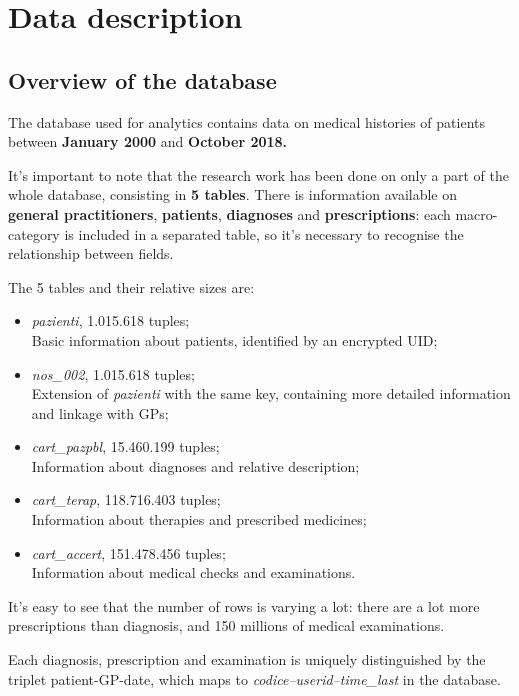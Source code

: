 \chapter{Data description}

\section{Overview of the database}
The database used for analytics contains data on medical histories of patients between \textbf{January 2000} and \textbf{October 2018.} 

It's important to note that the research work has been done on only a part of the whole database, consisting in \textbf{5 tables}. There is information available on \textbf{general practitioners}, \textbf{patients}, \textbf{diagnoses} and \textbf{prescriptions}: each macro-category is included in a separated table, so it's necessary to recognise the relationship between fields.

The 5 tables and their relative sizes are:
\begin{itemize}
	\item \textit{pazienti}, 1.015.618 tuples; \\
	Basic information about patients, identified by an encrypted UID;
	\item \textit{nos\_002}, 1.015.618 tuples; \\
	Extension of \textit{pazienti} with the same key, containing more detailed information and linkage with GPs;
	\item \textit{cart\_pazpbl}, 15.460.199 tuples; \\
	Information about diagnoses and relative description;
	\item \textit{cart\_terap}, 118.716.403 tuples; \\
	Information about therapies and prescribed medicines;
	\item \textit{cart\_accert}, 151.478.456 tuples; \\
	Information about medical checks and examinations.
\end{itemize}

It's easy to see that the number of rows is varying a lot: there are a lot more prescriptions than diagnosis, and 150 millions of medical examinations. 

Each diagnosis, prescription and examination is uniquely distinguished by the triplet patient-GP-date, which maps to \textit{codice--userid--time\_last} in the database. 

